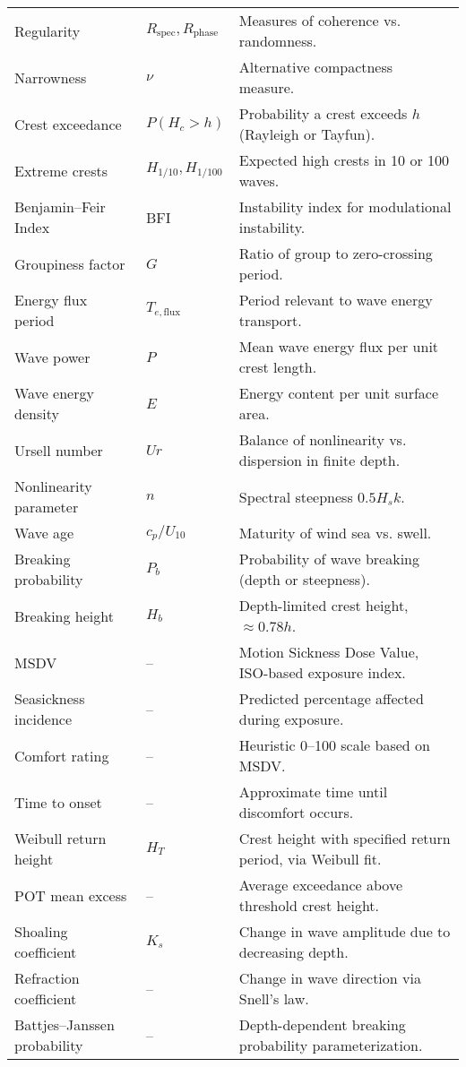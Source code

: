 \documentclass[11pt]{article}
\begin{document}
\begin{longtable}{|l|l|p{8cm}|}
Regularity & $R_{\text{spec}}, R_{\text{phase}}$ & Measures of coherence vs. randomness. \\
Narrowness & $\nu$ & Alternative compactness measure. \\
\hline
Crest exceedance & $P(H_c>h)$ & Probability a crest exceeds $h$ (Rayleigh or Tayfun). \\
Extreme crests & $H_{1/10}, H_{1/100}$ & Expected high crests in 10 or 100 waves. \\
Benjamin–Feir Index & BFI & Instability index for modulational instability. \\
Groupiness factor & $G$ & Ratio of group to zero-crossing period. \\
\hline
Energy flux period & $T_{e,\text{flux}}$ & Period relevant to wave energy transport. \\
Wave power & $P$ & Mean wave energy flux per unit crest length. \\
Wave energy density & $E$ & Energy content per unit surface area. \\
\hline
Ursell number & $Ur$ & Balance of nonlinearity vs. dispersion in finite depth. \\
Nonlinearity parameter & $n$ & Spectral steepness $0.5H_sk$. \\
Wave age & $c_p/U_{10}$ & Maturity of wind sea vs. swell. \\
\hline
Breaking probability & $P_b$ & Probability of wave breaking (depth or steepness). \\
Breaking height & $H_b$ & Depth-limited crest height, $\approx 0.78 h$. \\
\hline
MSDV & -- & Motion Sickness Dose Value, ISO-based exposure index. \\
Seasickness incidence & -- & Predicted percentage affected during exposure. \\
Comfort rating & -- & Heuristic 0--100 scale based on MSDV. \\
Time to onset & -- & Approximate time until discomfort occurs. \\
\hline
Weibull return height & $H_{T}$ & Crest height with specified return period, via Weibull fit. \\
POT mean excess & -- & Average exceedance above threshold crest height. \\
\hline
Shoaling coefficient & $K_s$ & Change in wave amplitude due to decreasing depth. \\
Refraction coefficient & -- & Change in wave direction via Snell’s law. \\
Battjes–Janssen probability & -- & Depth-dependent breaking probability parameterization. \\

\end{longtable}
\end{document}
